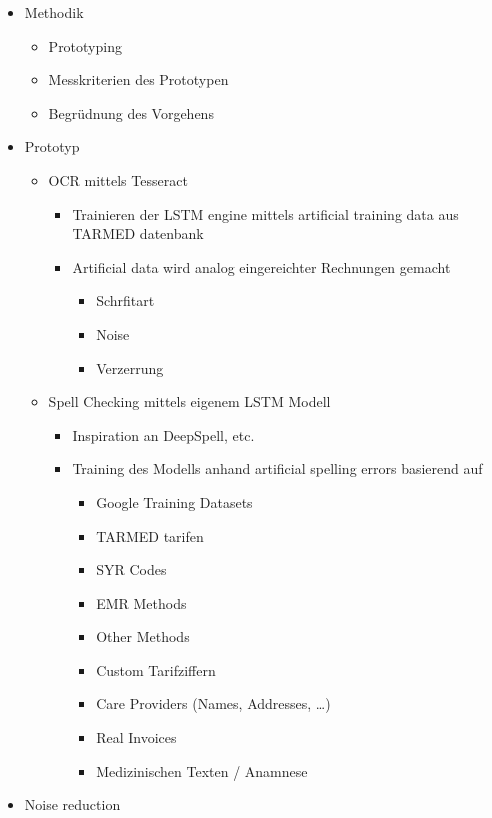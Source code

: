 \documentclass[12pt, twoside]{extarticle}
\begin{document}
\begin{itemize}
    \item Methodik
    \begin{itemize}
		\item Prototyping
		\item Messkriterien des Prototypen
		\item Begrüdnung des Vorgehens
    \end{itemize}
	\item Prototyp
    \begin{itemize}
		\item OCR mittels Tesseract
        \begin{itemize}
			\item Trainieren der LSTM engine mittels artificial training data aus TARMED datenbank
			\item Artificial data wird analog eingereichter Rechnungen gemacht
            \begin{itemize}
				\item Schrfitart
				\item Noise
				\item Verzerrung
            \end{itemize}
        \end{itemize}
	    \item Spell Checking mittels eigenem LSTM Modell
        \begin{itemize}
		    \item Inspiration an DeepSpell, etc.
		    \item Training des Modells anhand artificial spelling errors basierend auf
            \begin{itemize}
				\item Google Training Datasets
				\item TARMED tarifen
				\item SYR Codes
				\item EMR Methods
				\item Other Methods
				\item Custom Tarifziffern
				\item Care Providers (Names, Addresses, …)
				\item Real Invoices
				\item Medizinischen Texten / Anamnese
            \end{itemize}
        \end{itemize}
    \end{itemize}
    \item Noise reduction

\end{itemize}
\end{document}
